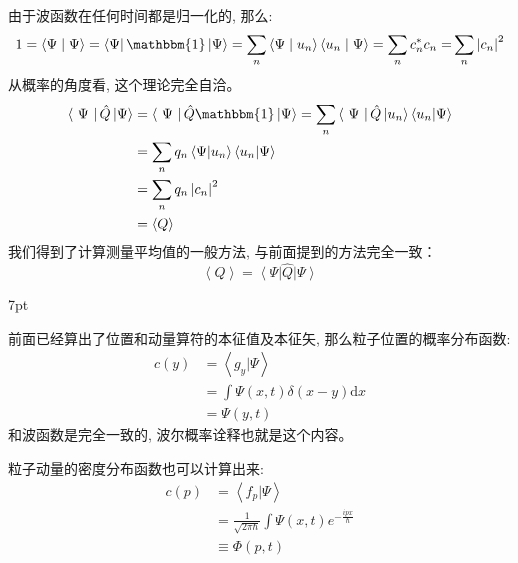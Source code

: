 \documentclass[a4paper,zihao=-4,linespread=1]{ctexrep}
\newenvironment{thinknote}{%
\def\FrameCommand{%
\hspace{1pt}%
{\color{BurlyWood}\vrule width 2pt}%
{\color{formalshade}\vrule width 4pt}%
\colorbox{formalshade}%
}%
\MakeFramed{\advance\hsize-\width\FrameRestore}%
\noindent\hspace{-4.55pt}%
\begin{adjustwidth}{}{7pt}%
\vspace{2pt}\vspace{2pt}%
}
{%
\vspace{2pt}\end{adjustwidth}\endMakeFramed%
}
\begin{document}
    由于波函数在任何时间都是归一化的, 那么:
    \begin{equation*}
        1 = \left\langle {\Psi }
    \mathrel{\left | {\vphantom {\Psi  \Psi }}
    \right. \kern-\nulldelimiterspace}
    {\Psi } \right\rangle  = \left\langle \Psi  \right|\mathbbm{1}\left| \Psi  \right\rangle  = \sum\limits_n {\left\langle {\Psi }
    \mathrel{\left | {\vphantom {\Psi  {{u_n}}}}
    \right. \kern-\nulldelimiterspace}
    {{{u_n}}} \right\rangle \left\langle {{{u_n}}}
    \mathrel{\left | {\vphantom {{{u_n}} \Psi }}
    \right. \kern-\nulldelimiterspace}
    {\Psi } \right\rangle }  = \sum\limits_n {c_n^*{c_n} = } \sum\limits_n {{{\left| {{c_n}} \right|}^2}} 
    \end{equation*}
    从概率的角度看, 这个理论完全自洽。
    \begin{align*}
        \left\langle \Psi \right| \hat{Q}  \left| \Psi  \right\rangle & = \left\langle \Psi \right| \hat{Q} \mathbbm{1} \left| \Psi  \right\rangle = \sum_{n} \left\langle \Psi \right| \hat{Q} \left| u_n  \right \rangle\left \langle u_n  | \Psi  \right \rangle \\ 
        &=\sum_{n} q_n\left\langle  \Psi  |u_n  \right\rangle\left \langle u_n  | \Psi  \right \rangle\\
        &=\sum_{n} q_n\left| c_n \right| ^2\\
        &=\left\langle Q \right\rangle 
    \end{align*}
    我们得到了计算测量平均值的一般方法, 与前面提到的方法完全一致：
    \begin{equation}
        \label{eq:3.14}
        \boxed{\left\langle Q \right\rangle=\left\langle \Psi \right| \hat{Q}  \left| \Psi  \right\rangle}
    \end{equation}
    \begin{thinknote}
        \setlength\parindent{2em}前面已经算出了位置和动量算符的本征值及本征矢, 那么粒子位置的概率分布函数:
        \begin{align*}
            c\left ( y \right ) & = \left \langle g_y| \Psi  \right \rangle \\& = \int \Psi \left ( x,t \right ) \delta(x-y)\mathrm{d}x
            \\&=\Psi \left ( y,t \right ) 
        \end{align*}
        和波函数是完全一致的, 波尔概率诠释也就是这个内容。

        \setlength\parindent{2em}粒子动量的密度分布函数也可以计算出来:
        \begin{align*}
            c\left ( p \right ) & = \left \langle f_p  | \Psi  \right \rangle \\ & = \frac{1}{\sqrt{2\pi\hbar} } \int  \Psi(x,t)e^{-\frac{ipx}{\hbar } }\\
            &\equiv \Phi(p,t)
        \end{align*}
    \end{thinknote}
\end{document}

